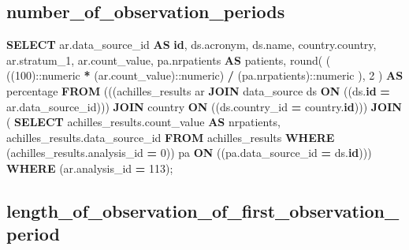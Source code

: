 \documentclass[
]{book}
\newenvironment{Shaded}{\begin{snugshade}}{\end{snugshade}}
\newcommand{\CharTok}[1]{\textcolor[rgb]{0.31,0.60,0.02}{#1}}
\newcommand{\DecValTok}[1]{\textcolor[rgb]{0.00,0.00,0.81}{#1}}
\newcommand{\FunctionTok}[1]{\textcolor[rgb]{0.00,0.00,0.00}{#1}}
\newcommand{\KeywordTok}[1]{\textcolor[rgb]{0.13,0.29,0.53}{\textbf{#1}}}
\newcommand{\NormalTok}[1]{#1}
\newcommand{\OperatorTok}[1]{\textcolor[rgb]{0.81,0.36,0.00}{\textbf{#1}}}
\begin{document}
\hypertarget{number_of_observation_periods}{%
\subsection*{number\_of\_observation\_periods}\label{number_of_observation_periods}}

\begin{Shaded}
\begin{Highlighting}[]
\KeywordTok{SELECT}\NormalTok{ ar.data\_source\_id }\KeywordTok{AS} \KeywordTok{id}\NormalTok{,}
\NormalTok{   ds.acronym,}
\NormalTok{   ds.name,}
\NormalTok{   country.country,}
\NormalTok{   ar.stratum\_1,}
\NormalTok{   ar.count\_value,}
\NormalTok{   pa.nrpatients }\KeywordTok{AS}\NormalTok{ patients,}
   \FunctionTok{round}\NormalTok{(}
\NormalTok{     (}
\NormalTok{       ((}\DecValTok{100}\NormalTok{):}\CharTok{:numeric} \OperatorTok{*}\NormalTok{ (ar.count\_value):}\CharTok{:numeric}\NormalTok{)}
       \OperatorTok{/}
\NormalTok{       (pa.nrpatients):}\CharTok{:numeric}
\NormalTok{     ),}
     \DecValTok{2}
\NormalTok{   ) }\KeywordTok{AS}\NormalTok{ percentage}
  \KeywordTok{FROM}\NormalTok{ (((achilles\_results ar}
    \KeywordTok{JOIN}\NormalTok{ data\_source ds }\KeywordTok{ON}\NormalTok{ ((ds.}\KeywordTok{id} \OperatorTok{=}\NormalTok{ ar.data\_source\_id)))}
    \KeywordTok{JOIN}\NormalTok{ country }\KeywordTok{ON}\NormalTok{ ((ds.country\_id }\OperatorTok{=}\NormalTok{ country.}\KeywordTok{id}\NormalTok{)))}
    \KeywordTok{JOIN}\NormalTok{ ( }\KeywordTok{SELECT}\NormalTok{ achilles\_results.count\_value }\KeywordTok{AS}\NormalTok{ nrpatients,}
\NormalTok{           achilles\_results.data\_source\_id}
          \KeywordTok{FROM}\NormalTok{ achilles\_results}
         \KeywordTok{WHERE}\NormalTok{ (achilles\_results.analysis\_id }\OperatorTok{=} \DecValTok{0}\NormalTok{)) pa}
           \KeywordTok{ON}\NormalTok{ ((pa.data\_source\_id }\OperatorTok{=}\NormalTok{ ds.}\KeywordTok{id}\NormalTok{)))}
 \KeywordTok{WHERE}\NormalTok{ (ar.analysis\_id }\OperatorTok{=} \DecValTok{113}\NormalTok{);}
\end{Highlighting}
\end{Shaded}

\hypertarget{length_of_observation_of_first_observation_period}{%
\subsection*{length\_of\_observation\_of\_first\_observation\_period}\label{length_of_observation_of_first_observation_period}}
\end{document}
